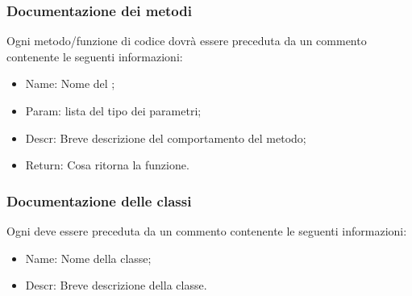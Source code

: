 \subsubsection{Documentazione dei metodi}
\label{5.3.2}
Ogni metodo/funzione di codice dovrà essere preceduta da un commento contenente le seguenti informazioni:
\begin{itemize}
\item Name: Nome del ;
\item Param: lista del tipo dei parametri;
\item Descr: Breve descrizione del comportamento del metodo;
\item Return: Cosa ritorna la funzione.
\end{itemize}

\subsubsection{Documentazione delle classi}
\label{5.3.3}
Ogni  deve essere preceduta da un commento contenente le seguenti informazioni:
\begin{itemize}
\item Name: Nome della classe;
\item Descr: Breve descrizione della classe.
\end{itemize}

